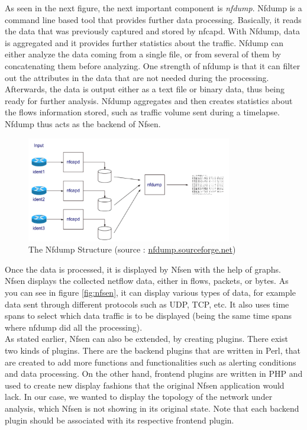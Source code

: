 As seen in the next figure, the next important component is \textit{nfdump}. Nfdump is a command line based tool that provides further data processing. Basically, it reads the data that was previously captured and stored by nfcapd. With Nfdump, data is aggregated and it provides further statistics about the traffic. Nfdump can either analyze the data coming from a single file, or from several of them by concatenating them before analyzing. One strength of nfdump is that it can filter out the attributes in the data that are not needed during the processing. Afterwards, the data is output either as a text file or binary data, thus being ready for further analysis. Nfdump aggregates and then creates statistics about the flows information stored, such as traffic volume sent during a timelapse. Nfdump thus acts as the backend of Nfsen.\\

\begin{figure}[!h]
	\centering
	\includegraphics[width=0.8\textwidth]{res/nfdump.png}
	\caption{The Nfdump Structure (source : \url{nfdump.sourceforge.net})}
	\label{fig:nfdump}
\end{figure}

Once the data is processed, it is displayed by Nfsen with the help of graphs. Nfsen displays the collected netflow data, either in flows, packets, or bytes. As you can see in figure \ref{fig:nfsen}, it can display various types of data, for example data sent through different protocols such as UDP, TCP, etc. It also uses time spans to select which data traffic is to be displayed (being the same time spans where nfdump did all the processing).\\

As stated earlier, Nfsen can also be extended, by creating plugins. There exist two kinds of plugins. There are the backend plugins that are written in Perl, that are created to add more functions and functionalities such as alerting conditions and data processing. On the other hand, frontend plugins are written in PHP and used to create new display fashions that the original Nfsen application would lack. In our case, we wanted to display the topology of the network under analysis, which Nfsen is not showing in its original state. Note that each backend plugin should be associated with its respective frontend plugin.

